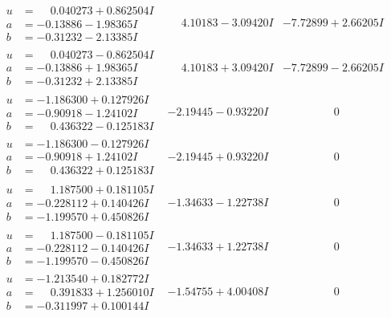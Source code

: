 \documentclass[1p]{elsarticle_modified}
\theoremstyle{definition}
\begin{document}
$$\begin{array}{c|c|c}
\begin{aligned}
u &= \phantom{-}0.040273 + 0.862504 I \\
a &= -0.13886 - 1.98365 I \\
b &= -0.31232 - 2.13385 I\end{aligned}
 & \phantom{-}4.10183 - 3.09420 I & -7.72899 + 2.66205 I \\ \hline\begin{aligned}
u &= \phantom{-}0.040273 - 0.862504 I \\
a &= -0.13886 + 1.98365 I \\
b &= -0.31232 + 2.13385 I\end{aligned}
 & \phantom{-}4.10183 + 3.09420 I & -7.72899 - 2.66205 I \\ \hline\begin{aligned}
u &= -1.186300 + 0.127926 I \\
a &= -0.90918 - 1.24102 I \\
b &= \phantom{-}0.436322 - 0.125183 I\end{aligned}
 & -2.19445 - 0.93220 I & \phantom{-0.000000 } 0 \\ \hline\begin{aligned}
u &= -1.186300 - 0.127926 I \\
a &= -0.90918 + 1.24102 I \\
b &= \phantom{-}0.436322 + 0.125183 I\end{aligned}
 & -2.19445 + 0.93220 I & \phantom{-0.000000 } 0 \\ \hline\begin{aligned}
u &= \phantom{-}1.187500 + 0.181105 I \\
a &= -0.228112 + 0.140426 I \\
b &= -1.199570 + 0.450826 I\end{aligned}
 & -1.34633 - 1.22738 I & \phantom{-0.000000 } 0 \\ \hline\begin{aligned}
u &= \phantom{-}1.187500 - 0.181105 I \\
a &= -0.228112 - 0.140426 I \\
b &= -1.199570 - 0.450826 I\end{aligned}
 & -1.34633 + 1.22738 I & \phantom{-0.000000 } 0 \\ \hline\begin{aligned}
u &= -1.213540 + 0.182772 I \\
a &= \phantom{-}0.391833 + 1.256010 I \\
b &= -0.311997 + 0.100144 I\end{aligned}
 & -1.54755 + 4.00408 I & \phantom{-0.000000 } 0 \\ \hline\begin{aligned}

\end{aligned}
\end{array}$$
\end{document}
